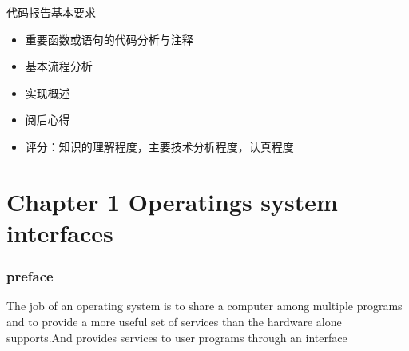 \documentclass{thuemp}
\begin{document}
\wuhao 
代码报告基本要求
\begin{itemize}
  \item 重要函数或语句的代码分析与注释
  \item 基本流程分析
  \item 实现概述
  \item 阅后心得
  \item 评分：知识的理解程度，主要技术分析程度，认真程度
\end{itemize}
\part*{Chapter 1 Operatings system interfaces}
\section*{preface}
The job of an operating system is to share a computer among multiple programs and to provide a more useful set of services than the hardware alone supports.And provides services to user programs through an interface\\
\end{document}
